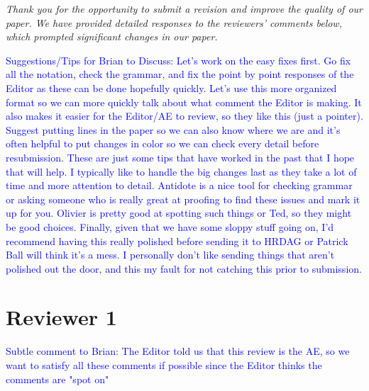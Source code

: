 \documentclass[letterpaper, parskip]{scrartcl}
\newcounter{responsectr}[section]     %
\newcommand{\reply}[1]{%
	\refstepcounter{responsectr}%
		\begin{tcolorbox}
			\itshape #1
		\end{tcolorbox}
}
\begin{document}
\reply{%
	Thank you for the opportunity to submit a revision and improve the quality of our paper. We have provided detailed responses to the reviewers' comments below, which prompted significant changes in our paper.
}


\textcolor{blue}{Suggestions/Tips for Brian to Discuss: Let's work on the easy fixes first. Go fix all the notation, check the grammar, and fix the point by point responses of the Editor as these can be done hopefully quickly. Let's use this more organized format so we can more quickly talk about what comment the Editor is making. It also makes it easier for the Editor/AE to review, so they like this (just a pointer). Suggest putting lines in the paper so we can also know where we are and it's often helpful to put changes in color so we can check every detail before resubmission. These are just some tips that have worked in the past that I hope that will help. I typically like to handle the big changes last as they take a lot of time and more attention to detail. Antidote is a nice tool for checking grammar or asking someone who is really great at proofing to find these issues and mark it up for you. Olivier is pretty good at spotting such things or Ted, so they might be good choices. Finally, given that we have some sloppy stuff going on, I'd recommend having this really polished before sending it to HRDAG or Patrick Ball will think it's a mess. I personally don't like sending things that aren't polished out the door, and this my fault for not catching this prior to submission.}

	\clearpage
	\newpage

	\section*{Reviewer 1}

\textcolor{blue}{Subtle comment to Brian: The Editor told us that this review is the AE, so we want to satisfy all these comments if possible since the Editor thinks the comments are "spot on"}


	\setcounter{responsectr}{0}
\end{document}

